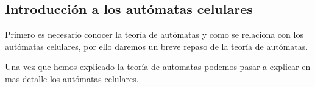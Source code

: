 \subsection{Introducci\'on a los aut\'omatas celulares} 
    \label{sec:AutomatasCelulares}
    Primero es necesario conocer la teor\'ia de aut\'omatas y como se relaciona con los aut\'omatas celulares,
        por ello daremos un breve repaso de la teor\'ia de aut\'omatas.
    \vskip 0.5cm
    
    \vskip 0.5cm
    Una vez que hemos explicado la teor\'ia de automatas podemos pasar a explicar en mas detalle los aut\'omatas celulares.
    \vskip 0.5cm
    
    
    
    
    
    
    